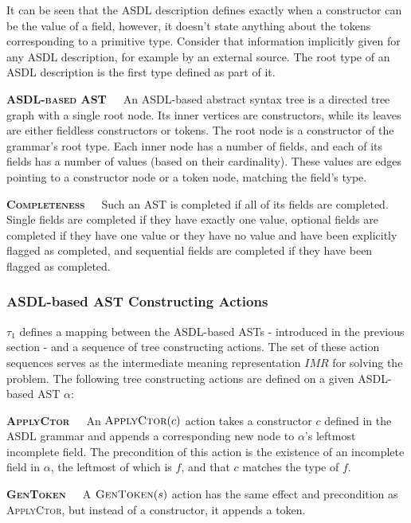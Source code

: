 \noindent
It can be seen that the ASDL description defines exactly when a constructor can be
the value of a field, however, it doesn't state anything about the tokens corresponding
to a primitive type. Consider that information implicitly given for any ASDL
description, for example by an external source. The root type of an ASDL
description is the first type defined as part of it.

\textbf{\textsc{ASDL-based AST}}\ \ \ An ASDL-based abstract syntax tree is a
directed tree graph with a single root node. Its inner vertices are constructors,
while its leaves are either fieldless constructors or tokens. The root node is a
constructor of the grammar's root type. Each inner node has a number of fields,
and each of its fields has a number of values (based on their cardinality).
These values are edges pointing to a constructor node or a token node,
matching the field's type.

\textbf{\textsc{Completeness}}\ \ \ Such an AST is completed if all of its fields
are completed. Single fields are completed if they have exactly one value,
optional fields are completed if they have one value or they have no value
and have been explicitly flagged as completed, and sequential fields are
completed if they have been flagged as completed.

\subsubsection{ASDL-based AST Constructing Actions}

\(\tau_{1}\) defines a mapping between the ASDL-based ASTs - introduced in the
previous section - and a sequence of tree constructing actions. The set of
these action sequences serves as the intermediate meaning representation
\(IMR\) for solving the problem. The following tree constructing actions
are defined on a given ASDL-based AST \(\alpha\):

\textbf{\textsc{ApplyCtor}}\ \ \ An \(\textsc{ApplyCtor}(c)\) action takes
a constructor \(c\) defined in the ASDL grammar and appends a corresponding
new node to \(\alpha\)'s leftmost incomplete field. The precondition of this
action is the existence of an incomplete field in \(\alpha\), the leftmost
of which is \(f\), and that \(c\) matches the type of \(f\).

\textbf{\textsc{GenToken}}\ \ \ A \(\textsc{GenToken}(s)\) action has the
same effect and precondition as \textsc{ApplyCtor}, but instead of a
constructor, it appends a token.

